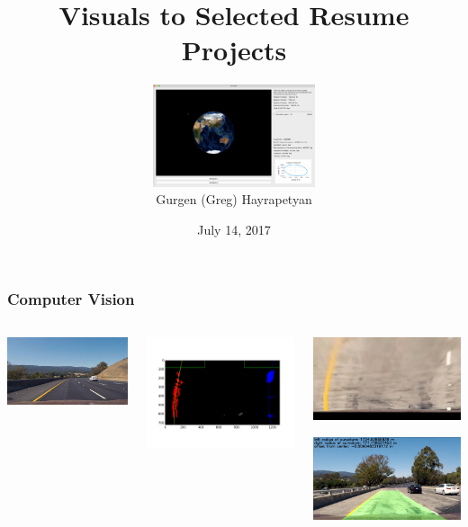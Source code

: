 \documentclass[mathserif]{beamer}
\title{Visuals to Selected Resume Projects}
\author{}
\institute{
}
\date{July 14, 2017}
\author[Gurgen Hayrapetyan]{
\includegraphics[height=3cm]{sat3.png}\\
Gurgen (Greg) Hayrapetyan}
\begin{document}
\begin{frame}
\titlepage
\end{frame}

\begin{frame}
\frametitle{Computer Vision}

\begin{columns}[c]
\column{1.5in}
\includegraphics[width=45mm]{alf1.jpg}

\includegraphics[width=5.5cm]{alf3.png}

\column{3in}
\begin{center}
\includegraphics[width=5.5cm]{alf2.jpg}

\includegraphics[width=5.5cm]{alf4.jpg}

\vspace{0.1cm}
\begin{columns}[c]
\column{1.5in}

\end{columns}
\end{center}
\end{columns}

\end{frame}
\end{document}
